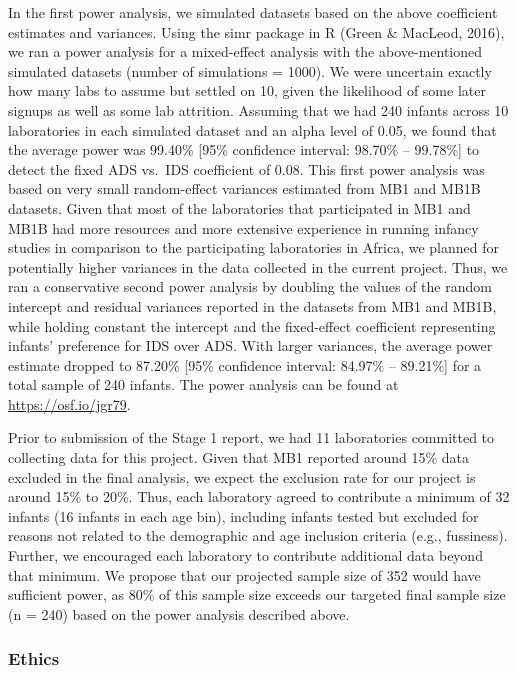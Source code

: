 \documentclass[
  ,man,floatsintext]{apa6}
\begin{document}
In the first power analysis, we simulated datasets based on the above coefficient estimates and variances. Using the simr package in R (Green \& MacLeod, 2016), we ran a power analysis for a mixed-effect analysis with the above-mentioned simulated datasets (number of simulations = 1000). We were uncertain exactly how many labs to assume but settled on 10, given the likelihood of some later signups as well as some lab attrition. Assuming that we had 240 infants across 10 laboratories in each simulated dataset and an alpha level of 0.05, we found that the average power was 99.40\% {[}95\% confidence interval: 98.70\% -- 99.78\%{]} to detect the fixed ADS vs.~IDS coefficient of 0.08. This first power analysis was based on very small random-effect variances estimated from MB1 and MB1B datasets. Given that most of the laboratories that participated in MB1 and MB1B had more resources and more extensive experience in running infancy studies in comparison to the participating laboratories in Africa, we planned for potentially higher variances in the data collected in the current project. Thus, we ran a conservative second power analysis by doubling the values of the random intercept and residual variances reported in the datasets from MB1 and MB1B, while holding constant the intercept and the fixed-effect coefficient representing infants' preference for IDS over ADS. With larger variances, the average power estimate dropped to 87.20\% {[}95\% confidence interval: 84.97\% -- 89.21\%{]} for a total sample of 240 infants. The power analysis can be found at \href{}{https://osf.io/jgr79}.

Prior to submission of the Stage 1 report, we had 11 laboratories committed to collecting data for this project. Given that MB1 reported around 15\% data excluded in the final analysis, we expect the exclusion rate for our project is around 15\% to 20\%. Thus, each laboratory agreed to contribute a minimum of 32 infants (16 infants in each age bin), including infants tested but excluded for reasons not related to the demographic and age inclusion criteria (e.g., fussiness). Further, we encouraged each laboratory to contribute additional data beyond that minimum. We propose that our projected sample size of 352 would have sufficient power, as 80\% of this sample size exceeds our targeted final sample size (n = 240) based on the power analysis described above.

\hypertarget{ethics}{%
\subsubsection{Ethics}\label{ethics}}
\end{document}
